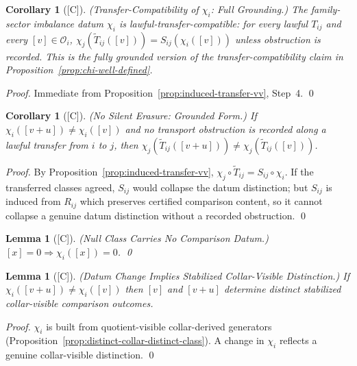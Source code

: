 \documentclass[12pt,oneside]{amsbook}
\theoremstyle{plain}
\newtheorem{lemma}[theorem]{Lemma}
\newtheorem{corollary}[theorem]{Corollary}
\theoremstyle{definition}
\theoremstyle{remark}
\newcommand{\status}[1]{\textup{[#1]}}
\begin{document}
\begin{corollary}[\status{C}]\label{cor:chi-transfer-compat-vv}
\textup{(Transfer-Compatibility of $\chi_i$: Full Grounding.)}
The family-sector imbalance datum $\chi_i$ is
lawful-transfer-compatible: for every lawful $T_{ij}$ and every
$[v] \in \mathcal{O}_i$, $\chi_j(\widetilde{T}_{ij}([v])) =
S_{ij}(\chi_i([v]))$ unless obstruction is recorded.  This is the
fully grounded version of the transfer-compatibility claim in
Proposition~\ref{prop:chi-well-defined}.
\end{corollary}

\begin{proof}
Immediate from Proposition~\ref{prop:induced-transfer-vv}, Step~4. \qed
\end{proof}

\begin{corollary}[\status{C}]\label{cor:no-silent-erasure-vv}
\textup{(No Silent Erasure: Grounded Form.)}
If $\chi_i([v+u]) \neq \chi_i([v])$ and no transport obstruction is
recorded along a lawful transfer from $i$ to $j$, then
$\chi_j(\widetilde{T}_{ij}([v+u])) \neq
\chi_j(\widetilde{T}_{ij}([v]))$.
\end{corollary}

\begin{proof}
By Proposition~\ref{prop:induced-transfer-vv}, $\chi_j \circ
\widetilde{T}_{ij} = S_{ij} \circ \chi_i$.  If the transferred
classes agreed, $S_{ij}$ would collapse the datum distinction; but
$S_{ij}$ is induced from $R_{ij}$ which preserves certified comparison
content, so it cannot collapse a genuine datum distinction without a
recorded obstruction. \qed
\end{proof}

\begin{lemma}[\status{C}]\label{lem:null-carries-no-datum}
\textup{(Null Class Carries No Comparison Datum.)}
$[x]=0 \Rightarrow \chi_i([x])=0$.  \qed
\end{lemma}

\begin{lemma}[\status{C}]\label{lem:datum-change-collar-visible}
\textup{(Datum Change Implies Stabilized Collar-Visible Distinction.)}
If $\chi_i([v+u]) \neq \chi_i([v])$ then $[v]$ and $[v+u]$ determine
distinct stabilized collar-visible comparison outcomes.
\end{lemma}

\begin{proof}
$\chi_i$ is built from quotient-visible collar-derived generators
(Proposition~\ref{prop:distinct-collar-distinct-class}).  A change in
$\chi_i$ reflects a genuine collar-visible distinction. \qed
\end{proof}
\end{document}
